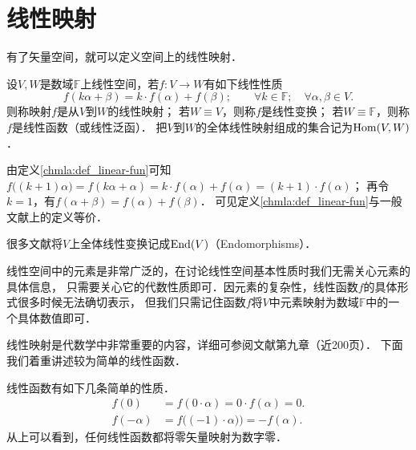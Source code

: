 \section{线性映射}\label{chmla:sec_linear-map}
有了矢量空间，就可以定义空间上的线性映射．
\begin{definition}\label{chmla:def_linear-fun}
    设$V,W$是数域$\mathbb{F}$上线性空间，若$f:V \to W$有如下线性性质
    \begin{equation}\label{chmla:eqn_linear-fun}
        f(k \alpha + \beta)=k\cdot  f(\alpha)+ f(\beta);
        \qquad \forall k\in \mathbb{F}; \quad \forall \alpha, \beta \in V .
    \end{equation}
    则称映射$f$是从$V$到$W$的{\heiti 线性映射}；
    若$W\equiv V$，则称$f$是{\heiti 线性变换}；
    若$W\equiv \mathbb{F}$，则称$f$是{\heiti 线性函数}（或{\kaishu 线性泛函}）．
    把$V$到$W$的全体线性映射组成的集合记为${\rm Hom}(V,W)$．
\end{definition}

  
  

\begin{example}
    由定义\ref{chmla:def_linear-fun}可知
    $f\bigl((k+1)\alpha \bigr)=f(k \alpha + \alpha)=k\cdot  f(\alpha)+ f(\alpha)=(k+1)\cdot  f(\alpha)$；
    再令$k=1$，有$f(\alpha + \beta)=f(\alpha)+ f(\beta)$．
    可见定义\ref{chmla:def_linear-fun}与一般文献上的定义等价．
\end{example}

很多文献将$V$上全体{\kaishu 线性变换}记成${\rm End}(V)$（Endomorphisms）．

线性空间中的元素是非常广泛的，在讨论线性空间基本性质时我们无需关心元素的具体信息，
只需要关心它的代数性质即可．因元素的复杂性，线性函数$f$的具体形式很多时候无法确切表示，
但我们只需记住函数$f$将$V$中元素映射为数域$\mathbb{F}$中的一个具体数值即可．


线性映射是代数学中非常重要的内容，详细可参阅文献\parencite{qiuws-2019-v2}第九章（近200页）．
下面我们着重讲述较为简单的线性函数．


\begin{example}
    线性函数有如下几条简单的性质．
    \begin{align}
        f(0) & =f(0 \cdot \alpha)= 0 \cdot f(\alpha) = 0. \\
        f(-\alpha)&=f\bigl((-1)\cdot\alpha)\bigr) = - f(\alpha).
    \end{align}
从上可以看到，任何线性函数都将零矢量映射为数字零．
\end{example}



